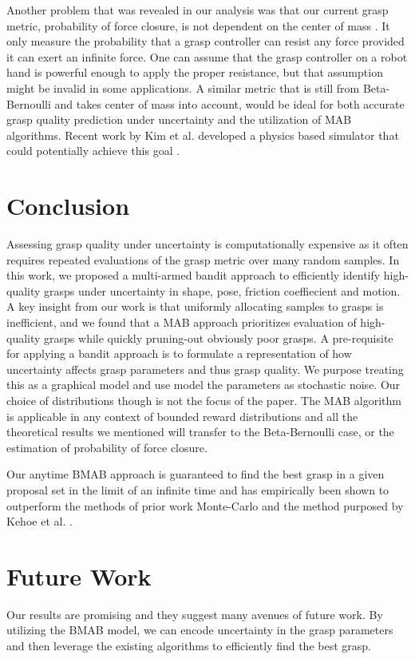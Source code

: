 \documentclass[journal,transmag]{IEEEtran}%
\begin{document}
Another problem that was revealed in our analysis was that our current grasp metric, probability of force closure, is not dependent on the center of mass \cite{ferrari1992}. It only measure the probability that a grasp controller can resist any force provided it can exert an infinite force.  One can assume that the grasp controller on a robot hand is powerful enough to apply the proper resistance, but that assumption might be invalid in some applications. A similar metric that is still from Beta-Bernoulli and takes center of mass into account, would be ideal for both accurate grasp quality prediction under uncertainty and the utilization of MAB algorithms.  Recent work by Kim et al. developed a physics based simulator that could potentially achieve this goal \cite{kim2012physically}. 

\section{Conclusion}
Assessing grasp quality under  uncertainty is computationally expensive as it often requires repeated evaluations of the grasp metric over many random samples.
In this work, we proposed a multi-armed bandit approach to efficiently identify high-quality grasps under uncertainty in shape, pose, friction coeffiecient and motion. 
A key insight from our work is that uniformly allocating samples to grasps is inefficient, and
 we found that a MAB approach prioritizes evaluation of high-quality grasps while quickly pruning-out obviously poor grasps.
A pre-requisite for applying a bandit approach is to formulate a representation  of how uncertainty affects grasp parameters and thus grasp quality.
We purpose treating this as a graphical model and use model the parameters as stochastic noise. Our choice of distributions though is not the focus of the paper. The MAB algorithm is applicable in any context of bounded reward distributions and all the theoretical results we mentioned will transfer to the Beta-Bernoulli case, or the estimation of probability of force closure. 

Our anytime BMAB approach is guaranteed to find the best grasp in a given proposal set in the limit of an infinite time and has empirically been shown to outperform the methods of prior work Monte-Carlo and the method purposed by Kehoe et al. \cite{kehoe2012estimating}. 



\section{Future Work}
Our results are promising and they suggest many avenues of future work. By utilizing the BMAB model, we can encode uncertainty in the grasp parameters and then leverage the existing algorithms to efficiently find the best grasp. 
\end{document}
